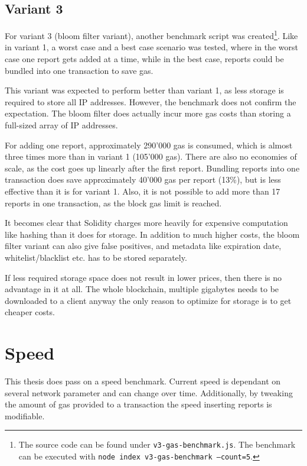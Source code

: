 \subsection{Variant 3}
For variant 3 (bloom filter variant), another benchmark script was created\footnote{The source code can be found under \texttt{v3-gas-benchmark.js}. The benchmark can be executed with \texttt{node index v3-gas-benchmark --count=5}.}. Like in variant 1, a worst case and a best case scenario was tested, where in the worst case one report gets added at a time, while in the best case, reports could be bundled into one transaction to save gas.

This variant was expected to perform better than variant 1, as less storage is required to store all IP addresses. However, the benchmark does not confirm the expectation. The bloom filter does actually incur more gas costs than storing a full-sized array of IP addresses. 

For adding one report, approximately 290'000 gas is consumed, which is almost three times more than in variant 1 (105'000 gas). There are also no economies of scale, as the cost goes up linearly after the first report. Bundling reports into one transaction does save approximately 40'000 gas per report (13\%), but is less effective than it is for variant 1. Also, it is not possible to add more than 17 reports in one transaction, as the block gas limit is reached.

It becomes clear that Solidity charges more heavily for expensive computation like hashing than it does for storage.
In addition to much higher costs, the bloom filter variant can also give false positives, and metadata like expiration date, whitelist/blacklist etc. has to be stored separately.

If less required storage space does not result in lower prices, then there is no advantage in it at all. The whole blockchain, multiple gigabytes needs to be downloaded to a client anyway \textemdash {} the only reason to optimize for storage is to get cheaper costs.

\section{Speed}

This thesis does pass on a speed benchmark. Current speed is dependant on several network parameter and can change over time. Additionally, by tweaking the amount of gas provided to a transaction the speed inserting reports is modifiable.


